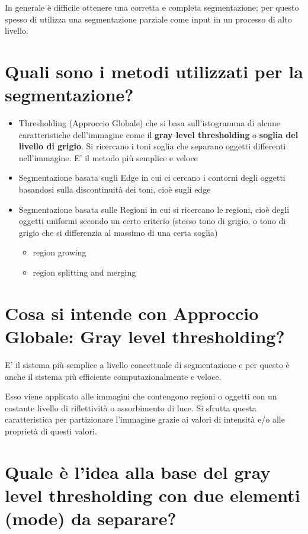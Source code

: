 In generale è difficile ottenere una corretta e completa segmentazione; per questo spesso di utilizza una segmentazione parziale come input in un processo di alto livello.

\section{Quali sono i metodi utilizzati per la segmentazione?}
\begin{itemize}
\item Thresholding (Approccio Globale) che si basa sull'istogramma di alcune caratteristiche dell'immagine come il \textbf{gray level
thresholding} o \textbf{soglia del livello di grigio}. Si ricercano i toni soglia che separano oggetti differenti nell'immagine. E’ il metodo più semplice e veloce

\item Segmentazione basata sugli Edge in cui ci cercano i contorni degli oggetti basandosi sulla discontinuità dei toni, cioè sugli edge

\item Segmentazione basata sulle Regioni in cui si ricercano le regioni, cioè degli oggetti uniformi secondo un certo criterio (stesso tono di grigio, o tono di grigio che si differenzia al massimo di una certa soglia)
\begin{itemize}
	\item region growing
	\item region splitting and merging
\end{itemize}
\end{itemize}

\section{Cosa si intende con Approccio Globale: Gray level thresholding?}
E' il sistema più semplice a livello concettuale di segmentazione e per questo è anche il sistema più efficiente computazionalmente e veloce.

Esso viene applicato alle immagini che contengono regioni o oggetti con un costante livello di riflettività o assorbimento di luce. Si sfrutta questa caratteristica per partizionare l'immagine grazie ai valori di intensità e/o alle proprietà di questi valori.

\section{Quale è l'idea alla base del gray level thresholding con due elementi (mode) da separare?}

